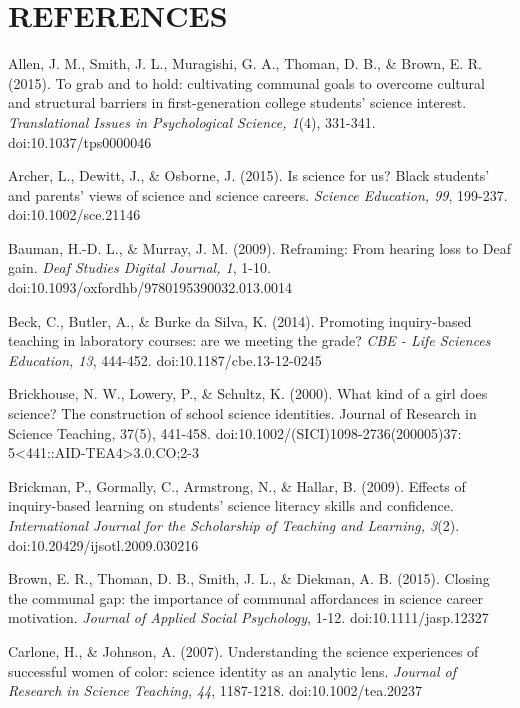 \documentclass[11.5pt]{sig-alternate} %
\begin{document}
\section*{REFERENCES}\par 

\leftskip 0.25in
\parindent -0.25in 

Allen, J. M., Smith, J. L., Muragishi, G. A., Thoman, D. B., \& Brown, E. R. (2015). To grab and to hold: cultivating communal goals to overcome cultural and structural barriers in first-generation college students' science interest. \textit{Translational Issues in Psychological Science, 1}(4), 331-341. doi:10.1037/tps0000046

Archer, L., Dewitt, J., \& Osborne, J. (2015). Is science for us? Black students' and parents' views of science and science careers. \textit{Science Education, 99}, 199-237. doi:10.1002/sce.21146

Bauman, H.-D. L., \& Murray, J. M. (2009). Reframing: From hearing loss to Deaf gain. \textit{Deaf Studies Digital Journal, 1}, 1-10. doi:10.1093/oxfordhb/9780195390032.013.0014

Beck, C., Butler, A., \& Burke da Silva, K. (2014). Promoting inquiry-based teaching in laboratory courses: are we meeting the grade? \textit{CBE - Life Sciences Education, 13}, 444-452. doi:10.1187/cbe.13-12-0245

Brickhouse, N. W., Lowery, P., \& Schultz, K. (2000). What kind of a girl does science? The construction of school science identities. Journal of Research in Science Teaching, 37(5), 441-458. doi:10.1002/(SICI)1098-2736(200005)37:\\5<441::AID-TEA4>3.0.CO;2-3

Brickman, P., Gormally, C., Armstrong, N., \& Hallar, B. (2009). Effects of inquiry-based learning on students’ science literacy skills and confidence. \textit{International Journal for the Scholarship of Teaching and Learning, 3}(2). doi:10.20429/ijsotl.2009.030216

Brown, E. R., Thoman, D. B., Smith, J. L., \& Diekman, A. B. (2015). Closing the communal gap: the importance of communal affordances in science career motivation. \textit{Journal of Applied Social Psychology}, 1-12. doi:10.1111/jasp.12327

Carlone, H., \& Johnson, A. (2007). Understanding the science experiences of successful women of color: science identity as an analytic lens. \textit{Journal of Research in Science Teaching, 44}, 1187-1218. doi:10.1002/tea.20237
\end{document}
